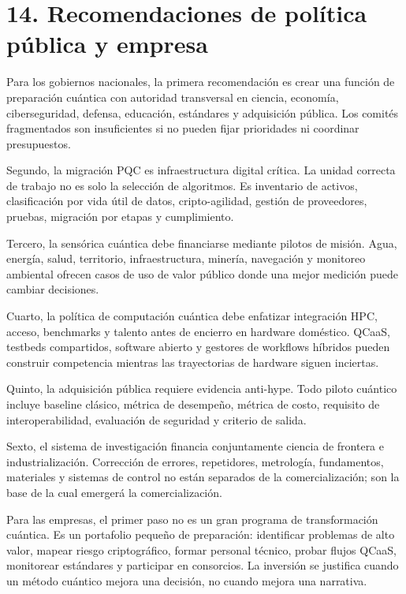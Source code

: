 \documentclass[
  11pt,
  letterpaper,
]{article}
\begin{document}
\section{14. Recomendaciones de política pública y
empresa}\label{recomendaciones-de-poluxedtica-puxfablica-y-empresa}

Para los gobiernos nacionales, la primera recomendación es crear una
función de preparación cuántica con autoridad transversal en ciencia,
economía, ciberseguridad, defensa, educación, estándares y adquisición
pública. Los comités fragmentados son insuficientes si no pueden fijar
prioridades ni coordinar presupuestos.

Segundo, la migración PQC es infraestructura digital crítica. La unidad
correcta de trabajo no es solo la selección de algoritmos. Es inventario
de activos, clasificación por vida útil de datos, cripto-agilidad,
gestión de proveedores, pruebas, migración por etapas y cumplimiento.

Tercero, la sensórica cuántica debe financiarse mediante pilotos de
misión. Agua, energía, salud, territorio, infraestructura, minería,
navegación y monitoreo ambiental ofrecen casos de uso de valor público
donde una mejor medición puede cambiar decisiones.

Cuarto, la política de computación cuántica debe enfatizar integración
HPC, acceso, benchmarks y talento antes de encierro en hardware
doméstico. QCaaS, testbeds compartidos, software abierto y gestores de
workflows híbridos pueden construir competencia mientras las
trayectorias de hardware siguen inciertas.

Quinto, la adquisición pública requiere evidencia anti-hype. Todo piloto
cuántico incluye baseline clásico, métrica de desempeño, métrica de
costo, requisito de interoperabilidad, evaluación de seguridad y
criterio de salida.

Sexto, el sistema de investigación financia conjuntamente ciencia de
frontera e industrialización. Corrección de errores, repetidores,
metrología, fundamentos, materiales y sistemas de control no están
separados de la comercialización; son la base de la cual emergerá la
comercialización.

Para las empresas, el primer paso no es un gran programa de
transformación cuántica. Es un portafolio pequeño de preparación:
identificar problemas de alto valor, mapear riesgo criptográfico, formar
personal técnico, probar flujos QCaaS, monitorear estándares y
participar en consorcios. La inversión se justifica cuando un método
cuántico mejora una decisión, no cuando mejora una narrativa.
\end{document}

